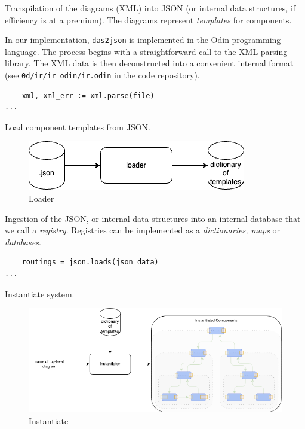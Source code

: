 \documentclass[10pt,anonymous,review]{acmart}
\begin{document}
  Transpilation of the diagrams (XML) into JSON (or internal data structures, if efficiency is at a premium). The diagrams represent \emph{templates} for components.
  
  In our implementation, \texttt{das2json} is implemented\cite{d2jrepo} in the Odin programming language. The process begins with a straightforward call to the XML parsing library. The XML data is then deconstructed into a convenient internal format (see \texttt{0d/ir/ir\_odin/ir.odin} in the code repository).

\begin{verbatim}
    xml, xml_err := xml.parse(file)
...
\end{verbatim}
  
\item Load component templates from JSON.

  \begin{figure}[h]
    \centering
    \includegraphics[width=0.6\linewidth]{./media/image3.png}
    \caption{Loader}
    \label{fig:load_templates}
  \end{figure}

  Ingestion of the JSON, or internal data structures into an internal database that we call a \emph{registry}. Registries can be implemented as a \emph{dictionaries, maps} or \emph{databases}.

\begin{verbatim}
    routings = json.loads(json_data)
...
\end{verbatim}

\item Instantiate system.
  \begin{figure}[h]
    \centering
    \includegraphics[width=0.8\linewidth]{./media/image4.png}
    \caption{Instantiate}
    \label{fig:instantiate_system}
  \end{figure}
\end{document}

